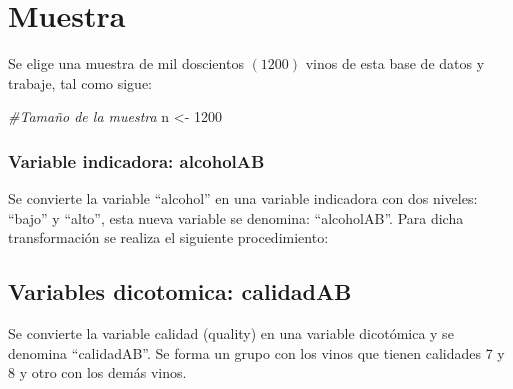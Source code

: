 \documentclass[
]{article}
\newenvironment{Shaded}{\begin{snugshade}}{\end{snugshade}}
\newcommand{\CommentTok}[1]{\textcolor[rgb]{0.56,0.35,0.01}{\textit{#1}}}
\newcommand{\DecValTok}[1]{\textcolor[rgb]{0.00,0.00,0.81}{#1}}
\newcommand{\KeywordTok}[1]{\textcolor[rgb]{0.13,0.29,0.53}{\textbf{#1}}}
\newcommand{\NormalTok}[1]{#1}
\newcommand{\OperatorTok}[1]{\textcolor[rgb]{0.81,0.36,0.00}{\textbf{#1}}}
\newcommand{\StringTok}[1]{\textcolor[rgb]{0.31,0.60,0.02}{#1}}
\begin{document}
\hypertarget{muestra}{%
\section{Muestra}\label{muestra}}

Se elige una muestra de mil doscientos \((1200)\) vinos de esta base de
datos y trabaje, tal como sigue:

\begin{Shaded}
\begin{Highlighting}[]
\CommentTok{#Tamaño de la muestra}
\NormalTok{n <-}\StringTok{ }\DecValTok{1200}
\end{Highlighting}
\end{Shaded}

\hypertarget{variable-indicadora-alcoholab}{%
\subsubsection{Variable indicadora:
alcoholAB}\label{variable-indicadora-alcoholab}}

Se convierte la variable ``alcohol'' en una variable indicadora con dos
niveles: ``bajo'' y ``alto'', esta nueva variable se denomina:
``alcoholAB''. Para dicha transformación se realiza el siguiente
procedimiento:

\hypertarget{variables-dicotomica-calidadab}{%
\subsection{Variables dicotomica:
calidadAB}\label{variables-dicotomica-calidadab}}

Se convierte la variable calidad (quality) en una variable dicotómica y
se denomina ``calidadAB''. Se forma un grupo con los vinos que tienen
calidades 7 y 8 y otro con los demás vinos.

\begin{Shaded}
\end{Shaded}
\end{document}
